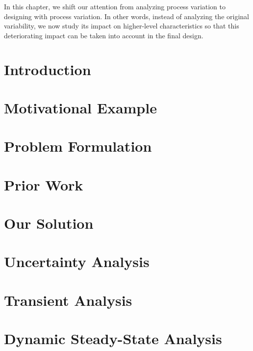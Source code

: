 In this chapter, we shift our attention from analyzing process variation to
designing with process variation. In other words, instead of analyzing the
original variability, we now study its impact on higher-level characteristics so
that this deteriorating impact can be taken into account in the final design.

\section{Introduction}

\section{Motivational Example}

\section{Problem Formulation}

\section{Prior Work}

\section{Our Solution}

\section{Uncertainty Analysis}

\section{Transient Analysis}

\section{Dynamic Steady-State Analysis}

